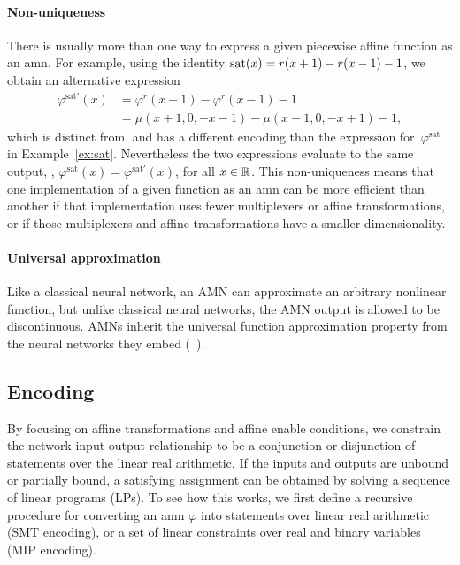 \documentclass[10pt]{article}
\newcommand{\sat}{\mathop{\rm sat}}
\newcommand{\amn}{\varphi}
\theoremstyle{remark}
\theoremstyle{definition}
\theoremstyle{plain}
\begin{document}
\paragraph{Non-uniqueness}
There is usually more than one way to express a given
piecewise affine function as an \acs{amn}. For example, using the identity
$\sat(x)=r(x+1)-r(x-1)-1$, we obtain an alternative expression
\begin{align*}
	\amn^{\mathrm{sat}'}(x) 
	&= \amn^r(x+1)-\amn^r(x-1)-1\\
	&= \mu(x+1,0,-x-1)-\mu(x-1,0,-x+1)-1,
\end{align*}
which is distinct from, and has a different encoding than the expression
for~$\amn^\mathrm{sat}$ in Example~\ref{ex:sat}. Nevertheless the two
expressions evaluate to the same output, \ie, $\amn^\mathrm{sat}(x) =
\amn^{\mathrm{sat}'}(x)$, for all $x\in\mathbb{R}$. 
This non-uniqueness means that one implementation of a given function as an
\acs{amn} can be more efficient than another if that implementation uses fewer
multiplexers or affine transformations, or if those multiplexers and affine
transformations have a smaller dimensionality.

\paragraph{Universal approximation}
Like a classical neural network, an AMN can approximate an arbitrary nonlinear
function, but unlike classical neural networks, the AMN output is allowed to be
discontinuous. AMNs inherit the universal function approximation property from
the neural networks they embed (\cf~\cite{Cybenko:1989}).

\subsection{Encoding}\label{sec:encoding}
By focusing on affine transformations and affine enable conditions, we
constrain the network input-output relationship to be a conjunction or
disjunction of statements over the linear real arithmetic. If the
inputs and outputs are unbound or partially bound, a satisfying
assignment can be obtained by solving a sequence of linear programs (LPs). To
see how this works, we first define a recursive procedure for converting an
\acl{amn} $\amn$ into statements over linear real arithmetic (SMT encoding), or
a set of linear constraints over real and binary variables (MIP encoding).
\end{document}
